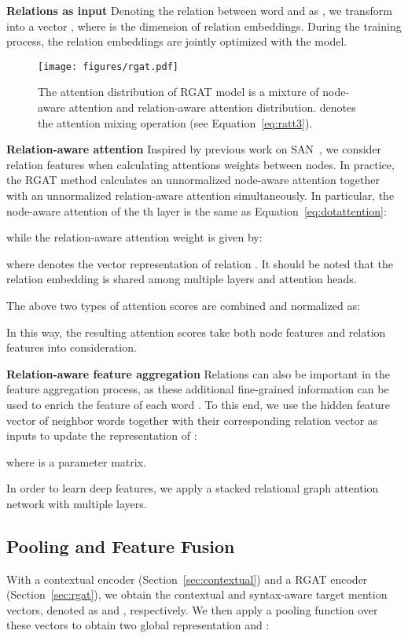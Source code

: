 \documentclass[journal]{IEEEtran}
\begin{document}
	\noindent\textbf{Relations as input} Denoting the relation between word  and  as , we transform  into a vector , where  is the dimension of relation embeddings. 
	During the training process, the relation embeddings are jointly optimized with the model.
	
	\begin{figure}[!t]
		\centering
		\texttt{[image: figures/rgat.pdf]}
		\caption{The attention distribution of RGAT model is a mixture of node-aware attention and relation-aware attention distribution.  denotes the attention mixing operation (see Equation~\ref{eq:ratt3}).}
		\label{fig:rgat}
	\end{figure}
	
	\noindent\textbf{Relation-aware attention}
	Inspired by previous work on SAN~\cite{shaw-etal-2018-self}, we consider relation features when calculating attentions weights between nodes.
	In practice, the RGAT method calculates an unnormalized node-aware attention  together with an unnormalized relation-aware attention  simultaneously.
	In particular, the node-aware attention  of the th layer is the same as Equation~\ref{eq:dotattention}:
	
	while the relation-aware attention weight is given by:
	 
	where  denotes the vector representation of relation . 
	It should be noted that the relation embedding  is shared among multiple layers and attention heads.


	The above two types of attention scores are combined and normalized as:
	
	
	In this way, the resulting attention scores take both node features and relation features into consideration.
	
	\noindent\textbf{Relation-aware feature aggregation} Relations can also be important in the feature aggregation process, as these additional fine-grained information can be used to enrich the feature of each word . 
	To this end, we use the hidden feature vector of neighbor words  together with their corresponding relation vector  as inputs to update the representation of :
	
	where  is a parameter matrix.
	
	In order to learn deep features, we apply a stacked relational graph attention network with multiple layers.
	
	\subsection{Pooling and Feature Fusion}
	With a contextual encoder (Section~\ref{sec:contextual}) and a RGAT encoder (Section~\ref{sec:rgat}), we obtain the contextual and syntax-aware target mention vectors, denoted as  and , respectively. 
	We then apply a pooling function over these vectors to obtain two global representation  and :
	
\end{document}
